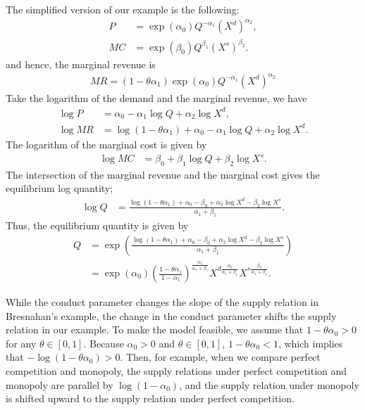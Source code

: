 \documentclass[11pt, a4paper]{article}
\theoremstyle{remark}
\begin{document}
The simplified version of our example is the following:
\begin{align}
    P & = \exp(\alpha_0) Q^{-\alpha_1} (X^{d})^{\alpha_2},\label{eq:simple_demand} \\
    MC & = \exp(\beta_0) Q^{\beta_1} (X^{s})^{\beta_2}. \label{eq:simple_marginal_cost}
\end{align}
and hence, the marginal revenue is
\begin{align}
    MR = (1- \theta\alpha_1)\exp(\alpha_0) Q^{-\alpha_1} (X^{d})^{\alpha_2}
\end{align}
Take the logarithm of the demand and the marginal revenue, we have
\begin{align}
    \log P & = \alpha_0 -\alpha_1 \log Q + \alpha_2 \log X^{d},\\
    \log MR& = \log (1 -\theta\alpha_1) + \alpha_0 -\alpha_1 \log Q + \alpha_2 \log X^{d}.
\end{align}
The logarithm of the marginal cost is given by
\begin{align}
    \log MC & = \beta_0 + \beta_1 \log Q + \beta_2 \log X^{s}.
\end{align}
The intersection of the marginal revenue and the marginal cost gives the equilibrium log quantity;
\begin{align}
    \log Q &= \frac{ \log (1 - \theta \alpha_1) + \alpha_0 - \beta_0 +\alpha_2 \log X^{d} - \beta_2 \log X^{s}}{\alpha_1 + \beta_1}.
\end{align}
Thus, the equilibrium quantity is given by
\begin{align}
    Q &= \exp\left(\frac{ \log (1 - \theta \alpha_1) + \alpha_0 - \beta_0 +\alpha_2 \log X^{d} - \beta_2 \log X^{s}}{\alpha_1 + \beta_1}\right)\\
    &= \exp(\alpha_0) \left( \frac{1 - \theta \alpha_1}{1 - \alpha_1}\right)^{\frac{\alpha_1}{\alpha_1 + \beta_1}} X^{d\frac{\alpha_2}{\alpha_1 + \beta_1}} X^{s\frac{\beta_2}{\alpha_1 + \beta_1}}.
\end{align}


While the conduct parameter changes the slope of the supply relation in Bresnahan's example, the change in the conduct parameter shifts the supply relation in our example.
To make the model feasible, we assume that $1- \theta \alpha_0 >0$ for any $\theta \in [0,1]$.
Because $\alpha_0>0$ and $\theta \in [0,1]$, $1- \theta\alpha_0 <1$, which implies that $- \log(1- \theta\alpha_0) > 0$.
Then, for example, when we compare perfect competition and monopoly,  the supply relations under perfect competition and monopoly are parallel by $\log(1 - \alpha_0)$, and the supply relation under monopoly is shifted upward to the supply relation under perfect competition.
\end{document}
